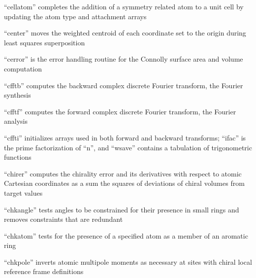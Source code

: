 \documentclass[letterpaper,11pt,english]{sphinxmanual}
\begin{document}

“cellatom” completes the addition of a symmetry related atom
to a unit cell by updating the atom type and attachment arrays


“center” moves the weighted centroid of each coordinate
set to the origin during least squares superposition


“cerror” is the error handling routine for the Connolly
surface area and volume computation


“cfftb” computes the backward complex discrete Fourier
transform, the Fourier synthesis



“cfftf” computes the forward complex discrete Fourier
transform, the Fourier analysis



“cffti” initializes arrays used in both forward and backward
transforms; “ifac” is the prime factorization of “n”, and
“wsave” contains a tabulation of trigonometric functions



“chirer” computes the chirality error and its derivatives
with respect to atomic Cartesian coordinates as a sum the
squares of deviations of chiral volumes from target values


“chkangle” tests angles to be constrained for their presence
in small rings and removes constraints that are redundant


“chkatom” tests for the presence of a specified atom as a
member of an aromatic ring


“chkpole” inverts atomic multipole moments as necessary
at sites with chiral local reference frame definitions
\end{document}
